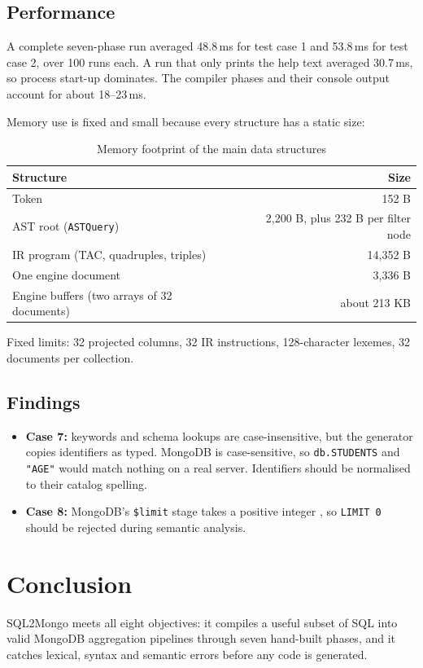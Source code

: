 \documentclass[12pt,a4paper]{report}
\newcommand{\codeus}{\textunderscore\allowbreak}
\DeclareRobustCommand{\code}[1]{\texttt{\let\_\codeus #1}}
\begin{document}
\section{Performance}
A complete seven-phase run averaged 48.8\,ms for test case 1 and 53.8\,ms for test case 2, over 100 runs each. A run that only prints the help text averaged 30.7\,ms, so process start-up dominates. The compiler phases and their console output account for about 18--23\,ms.

Memory use is fixed and small because every structure has a static size:
\begin{table}[H]
\centering\small
\begin{tabular}{|l|r|}
\hline
\textbf{Structure} & \textbf{Size} \\ \hline
Token & 152 B \\ \hline
AST root (\code{ASTQuery}) & 2,200 B, plus 232 B per filter node \\ \hline
IR program (TAC, quadruples, triples) & 14,352 B \\ \hline
One engine document & 3,336 B \\ \hline
Engine buffers (two arrays of 32 documents) & about 213 KB \\ \hline
\end{tabular}
\caption{Memory footprint of the main data structures}
\end{table}
Fixed limits: 32 projected columns, 32 IR instructions, 128-character lexemes, 32 documents per collection.

\section{Findings}\label{sec:findings}
\begin{itemize}
  \item \textbf{Case 7:} keywords and schema lookups are case-insensitive, but the generator copies identifiers as typed. MongoDB is case-sensitive, so \code{db.STUDENTS} and \code{"AGE"} would match nothing on a real server. Identifiers should be normalised to their catalog spelling.
  \item \textbf{Case 8:} MongoDB's \code{\$limit} stage takes a positive integer \cite{mongo-limit}, so \code{LIMIT 0} should be rejected during semantic analysis.
\end{itemize}

\chapter{Conclusion}
SQL2Mongo meets all eight objectives: it compiles a useful subset of SQL into valid MongoDB aggregation pipelines through seven hand-built phases, and it catches lexical, syntax and semantic errors before any code is generated.
\end{document}
